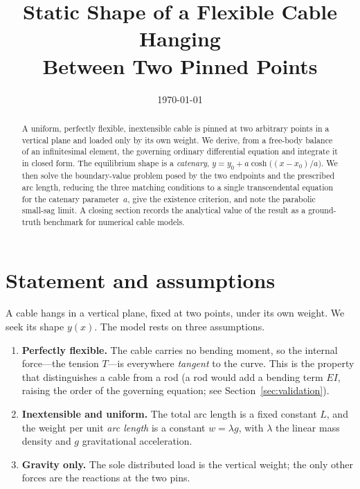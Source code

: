 \documentclass[11pt]{article}
\title{\textbf{Static Shape of a Flexible Cable Hanging\\Between Two Pinned Points}}
\author{}
\date{\today}
\theoremstyle{remark}
\begin{document}
\maketitle

\begin{abstract}
\noindent
A uniform, perfectly flexible, inextensible cable is pinned at two arbitrary points in
a vertical plane and loaded only by its own weight. We derive, from a free-body balance
of an infinitesimal element, the governing ordinary differential equation and integrate
it in closed form. The equilibrium shape is a \emph{catenary}, $y=y_0+a\cosh\!\big((x-x_0)/a\big)$.
We then solve the boundary-value problem posed by the two endpoints and the prescribed
arc length, reducing the three matching conditions to a single transcendental equation
for the catenary parameter~$a$, give the existence criterion, and note the parabolic
small-sag limit. A closing section records the analytical value of the result as a
ground-truth benchmark for numerical cable models.
\end{abstract}

\section{Statement and assumptions}
A cable hangs in a vertical plane, fixed at two points, under its own weight. We seek its
shape $y(x)$. The model rests on three assumptions.

\begin{enumerate}[label=(A\arabic*),leftmargin=*]
  \item \textbf{Perfectly flexible.} The cable carries no bending moment, so the internal
        force---the tension $T$---is everywhere \emph{tangent} to the curve. This is the
        property that distinguishes a cable from a rod (a rod would add a bending term
        $EI$, raising the order of the governing equation; see Section~\ref{sec:validation}).
  \item \textbf{Inextensible and uniform.} The total arc length is a fixed constant $L$,
        and the weight per unit \emph{arc length} is a constant $w=\lambda g$, with
        $\lambda$ the linear mass density and $g$ gravitational acceleration.
  \item \textbf{Gravity only.} The sole distributed load is the vertical weight; the only
        other forces are the reactions at the two pins.
\end{enumerate}
\end{document}
